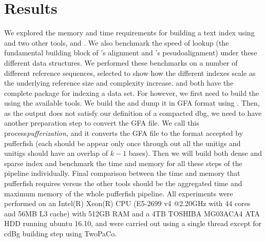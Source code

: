 \section{Results}\label{sec:results}

We explored the memory and time requirements for building a text index using
\pufferfish and two other tools, \bwa and \kallisto. We also benchmark the speed of
\kmer lookup (the fundamental building block of \bwa's alignment and \kallisto's
pesudoalignment) under these different data structures. We performed these
benchmarks on a number of different reference sequences, selected to show how
the different indexes scale as the underlying reference size and complexity
increase. \bwa and \kallisto both have the complete package for
indexing a data set. For \pufferfish however, we first need to build the \ccdbg using the available
tools. We build the \ccdbg and dump it in GFA format using \twopaco. Then, as the output does
not satisfy our definition of a compacted dbg, we need to have another preparation 
step to convert the GFA file. We call this process\emph{pufferization}, and it converts the GFA file to the format accepted by pufferfish
(each \kmer should be appear only once through out all the unitigs and unitigs should have an overlap of $k-1$ bases).
Then we will build both dense and sparse index and benchmark the time and memory for all these steps of the pipeline individually.
Final comparison between the time and memory that pufferfish requires versus the other tools should be the aggregated time and
maximum memory of the whole pufferfish pipeline.
All experiments
were performed on an Intel(R) Xeon(R) CPU (E5-2699 v4 @2.20GHz with 44 cores and
56MB L3 cache) with 512GB RAM and a 4TB TOSHIBA MG03ACA4 ATA HDD running ubuntu
16.10, and were carried out using a single thread except for cdBg building step using TwoPaCo.


